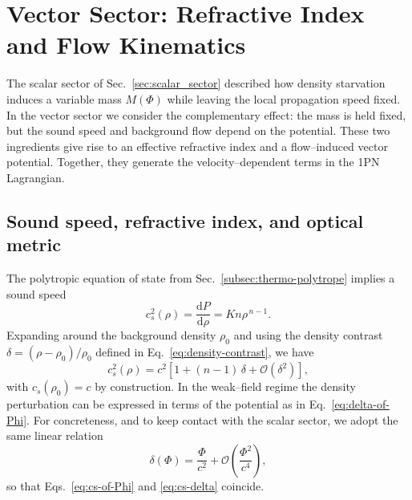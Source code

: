 \documentclass[11pt]{article}
\begin{document}
\section{Vector Sector: Refractive Index and Flow Kinematics}
\label{sec:vector_sector}

The scalar sector of Sec.~\ref{sec:scalar_sector} described how density
starvation induces a variable mass \(M(\Phi)\) while leaving the local
propagation speed fixed.  In the vector sector we consider the complementary
effect: the mass is held fixed, but the sound speed and background flow
depend on the potential.  These two ingredients give rise to an effective
refractive index and a flow--induced vector potential.  Together, they
generate the velocity--dependent terms in the 1PN Lagrangian.

\subsection{Sound speed, refractive index, and optical metric}
\label{subsec:vector-optical}

The polytropic equation of state from
Sec.~\ref{subsec:thermo-polytrope} implies a sound speed
\begin{equation}
  c_s^2(\rho) = \frac{\mathrm{d}P}{\mathrm{d}\rho}
  = K n \rho^{\,n-1}.
\end{equation}
Expanding around the background density \(\rho_0\) and using the density
contrast \(\delta = (\rho - \rho_0)/\rho_0\) defined in
Eq.~\eqref{eq:density-contrast}, we have
\begin{equation}
  c_s^2(\rho)
  = c^2 \left[ 1 + (n-1)\,\delta + \mathcal{O}(\delta^2) \right],
  \label{eq:cs-delta}
\end{equation}
with \(c_s(\rho_0) = c\) by construction.  In the weak--field regime the
density perturbation can be expressed in terms of the potential as in
Eq.~\eqref{eq:delta-of-Phi}.  For concreteness, and to keep contact with the
scalar sector, we adopt the same linear relation
\begin{equation}
  \delta(\Phi) = \frac{\Phi}{c^2}
  + \mathcal{O}\!\left(\frac{\Phi^2}{c^4}\right),
\end{equation}
so that Eqs.~\eqref{eq:cs-of-Phi} and \eqref{eq:cs-delta} coincide.
\end{document}
